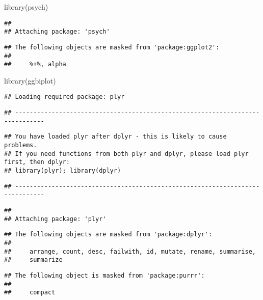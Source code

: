 \documentclass[
]{article}
\newenvironment{Shaded}{\begin{snugshade}}{\end{snugshade}}
\newcommand{\FunctionTok}[1]{\textcolor[rgb]{0.00,0.00,0.00}{#1}}
\newcommand{\NormalTok}[1]{#1}
\begin{document}
\begin{Shaded}
\begin{Highlighting}[]
\FunctionTok{library}\NormalTok{(psych)}
\end{Highlighting}
\end{Shaded}

\begin{verbatim}
## 
## Attaching package: 'psych'
\end{verbatim}

\begin{verbatim}
## The following objects are masked from 'package:ggplot2':
## 
##     %+%, alpha
\end{verbatim}

\begin{Shaded}
\begin{Highlighting}[]
\FunctionTok{library}\NormalTok{(ggbiplot)}
\end{Highlighting}
\end{Shaded}

\begin{verbatim}
## Loading required package: plyr
\end{verbatim}

\begin{verbatim}
## ------------------------------------------------------------------------------
\end{verbatim}

\begin{verbatim}
## You have loaded plyr after dplyr - this is likely to cause problems.
## If you need functions from both plyr and dplyr, please load plyr first, then dplyr:
## library(plyr); library(dplyr)
\end{verbatim}

\begin{verbatim}
## ------------------------------------------------------------------------------
\end{verbatim}

\begin{verbatim}
## 
## Attaching package: 'plyr'
\end{verbatim}

\begin{verbatim}
## The following objects are masked from 'package:dplyr':
## 
##     arrange, count, desc, failwith, id, mutate, rename, summarise,
##     summarize
\end{verbatim}

\begin{verbatim}
## The following object is masked from 'package:purrr':
## 
##     compact
\end{verbatim}
\end{document}
